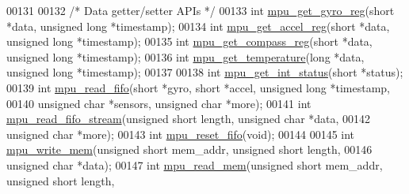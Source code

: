 \begin{DoxyCode}
00131 
00132 \textcolor{comment}{/* Data getter/setter APIs */}
00133 \textcolor{keywordtype}{int} \hyperlink{group___d_r_i_v_e_r_s_ga5555854590ad11495c0e30401294bae2}{mpu\_get\_gyro\_reg}(\textcolor{keywordtype}{short} *data, \textcolor{keywordtype}{unsigned} \textcolor{keywordtype}{long} *timestamp);
00134 \textcolor{keywordtype}{int} \hyperlink{group___d_r_i_v_e_r_s_gae4ae960e5df78049ece2647772a3d809}{mpu\_get\_accel\_reg}(\textcolor{keywordtype}{short} *data, \textcolor{keywordtype}{unsigned} \textcolor{keywordtype}{long} *timestamp);
00135 \textcolor{keywordtype}{int} \hyperlink{group___d_r_i_v_e_r_s_ga65e6b0ce980b8c0255d7be9b55c88c08}{mpu\_get\_compass\_reg}(\textcolor{keywordtype}{short} *data, \textcolor{keywordtype}{unsigned} \textcolor{keywordtype}{long} *timestamp);
00136 \textcolor{keywordtype}{int} \hyperlink{group___d_r_i_v_e_r_s_gaa449b565a157b4b8ca0f491b7ed46018}{mpu\_get\_temperature}(\textcolor{keywordtype}{long} *data, \textcolor{keywordtype}{unsigned} \textcolor{keywordtype}{long} *timestamp);
00137 
00138 \textcolor{keywordtype}{int} \hyperlink{group___d_r_i_v_e_r_s_ga0afd02d8c76d3278b488ef7038c26e3e}{mpu\_get\_int\_status}(\textcolor{keywordtype}{short} *status);
00139 \textcolor{keywordtype}{int} \hyperlink{group___d_r_i_v_e_r_s_ga2da20453aafbbba4a0f6fb9fbdd25572}{mpu\_read\_fifo}(\textcolor{keywordtype}{short} *gyro, \textcolor{keywordtype}{short} *accel, \textcolor{keywordtype}{unsigned} \textcolor{keywordtype}{long} *timestamp,
00140     \textcolor{keywordtype}{unsigned} \textcolor{keywordtype}{char} *sensors, \textcolor{keywordtype}{unsigned} \textcolor{keywordtype}{char} *more);
00141 \textcolor{keywordtype}{int} \hyperlink{group___d_r_i_v_e_r_s_ga13593044949b460e9f571eb57e9a0788}{mpu\_read\_fifo\_stream}(\textcolor{keywordtype}{unsigned} \textcolor{keywordtype}{short} length, \textcolor{keywordtype}{unsigned} \textcolor{keywordtype}{char} *data,
00142     \textcolor{keywordtype}{unsigned} \textcolor{keywordtype}{char} *more);
00143 \textcolor{keywordtype}{int} \hyperlink{group___d_r_i_v_e_r_s_gaf23e9f57c0059be6ec57862f0584de10}{mpu\_reset\_fifo}(\textcolor{keywordtype}{void});
00144 
00145 \textcolor{keywordtype}{int} \hyperlink{group___d_r_i_v_e_r_s_gafea59910bc3dd30ba3356b1c75213a5f}{mpu\_write\_mem}(\textcolor{keywordtype}{unsigned} \textcolor{keywordtype}{short} mem\_addr, \textcolor{keywordtype}{unsigned} \textcolor{keywordtype}{short} length,
00146     \textcolor{keywordtype}{unsigned} \textcolor{keywordtype}{char} *data);
00147 \textcolor{keywordtype}{int} \hyperlink{group___d_r_i_v_e_r_s_ga3374bececb6743893c9eab27645c1182}{mpu\_read\_mem}(\textcolor{keywordtype}{unsigned} \textcolor{keywordtype}{short} mem\_addr, \textcolor{keywordtype}{unsigned} \textcolor{keywordtype}{short} length,

\end{DoxyCode}
